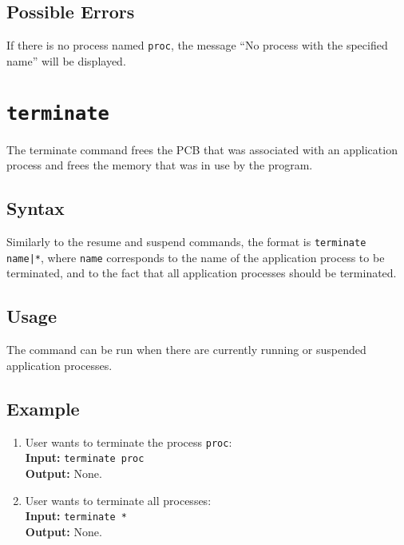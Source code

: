\subsection{Possible Errors}

If there is no process named {\tt proc}, the message ``No process with the specified name''
will be displayed.







\section{\tt terminate}
\label{terminate_cmd}

The terminate command frees the PCB that was associated with an application process and
frees the memory that was in use by the program.

\subsection{Syntax}

Similarly to the resume and suspend commands, the format is {\tt terminate name|*}, where
{\tt name} corresponds to the name of the application process to be terminated, and {\tt *}
to the fact that all application processes should be terminated.

\subsection{Usage}

The command can be run when there are currently running or suspended application processes.

\subsection{Example}
\begin{enumerate}
    \item User wants to terminate the process {\tt proc}: \\
        {\bf Input:} {\tt terminate proc} \\
        {\bf Output:} None.
    \item User wants to terminate all processes: \\
        {\bf Input:} {\tt terminate *} \\
        {\bf Output:} None.
\end{enumerate}
